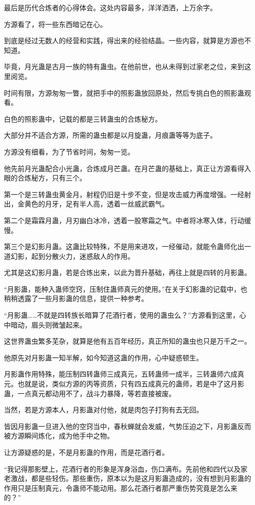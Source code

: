 \begin{this_body}
最后是历代合炼者的心得体会。这处内容最多，洋洋洒洒，上万余字。

方源看了，将一些东西暗记在心。

到底是经过无数人的经营和实践，得出来的经验结晶。一些内容，就算是方源也不知道。

毕竟，月光蛊是古月一族的特有蛊虫。在他前世，也从未得到过家老之位，来到这里阅览。

时间有限，方源匆匆一瞥，就把手中的照影蛊放回原处，然后专挑白色的照影蛊观看。

白色的照影蛊中，记载的都是三转蛊虫的合炼秘方。

大部分并不适合方源，所需的蛊虫都是以月旋蛊，月痕蛊等等为底子。

方源没有细看，为了节省时间，匆匆一览。

他先前月光蛊配合小光蛊，合炼成月芒蛊。在月芒蛊的基础上，真正让方源看得入眼的合炼秘方，只有三个。

第一个是三转蛊虫黄金月，射程仍旧是十步不变，但是攻击威力再度增强。一经射出，金黄色的月牙，足有半人高，透着一丝威武霸气。

第二个是霜霖月蛊，月刃幽白冰冷，透着一股寒霜之气。中者将冰寒入体，行动缓慢。

第三个是幻影月蛊。这蛊比较特殊，不是用来进攻，一经催动，就能令蛊师化出一道幻影，起到分散火力，迷惑敌人的作用。

尤其是这幻影月蛊，若是合炼出来，以此为晋升基础，再往上就是四转的月影蛊。

“月影蛊，能种入蛊师空窍，压制住蛊师真元的使用。”在关于幻影蛊的记载中，也稍稍透露了一些月影蛊的信息，提供一种参考。

“月影蛊……不就是四转族长暗算了花酒行者，使用的蛊虫么？”方源看到这里，心中暗动，眉头则微皱起来。

这世界蛊虫繁多芜杂，就算是他有五百年经历，真正所知的蛊虫也只是万千之一。

他原先对月影蛊一知半解，如今知道这蛊的作用，心中疑惑顿生。

月影蛊作用特殊，能压制四转蛊师三成真元，五转蛊师一成半，三转蛊师六成真元。也就是说，类似方源的丙等资质，只有四五成真元的蛊师，若是中了这月影蛊，一点真元都动用不了，战斗力暴降，等若直接被废。

当然，若是方源本人，月影蛊对付他，就是肉包子打狗有去无回。

皆因月影蛊一旦进入他的空窍当中，春秋蝉就会发威，气势压迫之下，月影蛊反而被方源瞬间炼化，成为他手中之物。

让方源疑惑的是，不是月影蛊的作用，而是花酒行者。

“我记得那影壁上，花酒行者的形象是浑身浴血，伤口满布。先前他和四代以及家老激战，都是些轻伤。那些重伤，原本以为是这月影蛊造成的，没有想到月影蛊的作用只是压制真元，令蛊师不能动用。那么花酒行者那严重伤势究竟是怎么来的？”


\end{this_body}
